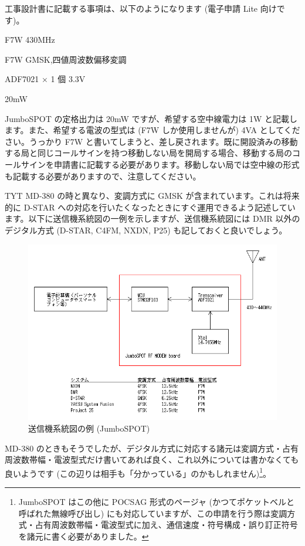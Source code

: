 \documentclass[a4j,oneside]{ujbook}
\begin{document}
工事設計書に記載する事項は、以下のようになります (電子申請 Lite 向けです)。
\begin{description}[style=nextline]
 \item[発射可能な電波の形式及び周波数の範囲] F7W 430MHz 
 \item[変調方式] F7W GMSK,四値周波数偏移変調 
 \item[終段管 (名称×個数・電圧)] ADF7021 × 1 個 3.3V 
 \item[定格出力] 20mW
\end{description}   
JumboSPOT の定格出力は 20mW ですが、希望する空中線電力は 1W と記載します。また、希望する電波の型式は (F7W しか使用しませんが) 4VA としてください。うっかり F7W と書いてしまうと、差し戻されます。既に開設済みの移動する局と同じコールサインを持つ移動しない局を開局する場合、移動する局のコールサインを申請書に記載する必要があります。移動しない局では空中線の形式も記載する必要がありますので、注意してください。

TYT MD-380 の時と異なり、変調方式に GMSK が含まれています。これは将来的に D-STAR への対応を行いたくなったときにすぐ運用できるよう記述しています。以下に送信機系統図の一例を示しますが、送信機系統図には DMR 以外のデジタル方式 (D-STAR, C4FM, NXDN, P25) も記しておくと良いでしょう。

\begin{figure}[H]
 \centering
 \includegraphics[width=15cm]{img/mmdvm-nopocsag.png}
 \caption{送信機系統図の例 (JumboSPOT)}
\end{figure}

MD-380 のときもそうでしたが、デジタル方式に対応する諸元は変調方式・占有周波数帯幅・電波型式だけ書いてあれば良く、これ以外については書かなくても良いようです (この辺りは相手も「分かっている」のかもしれません)\footnote{JumboSPOT はこの他に POCSAG 形式のページャ (かつてポケットベルと呼ばれた無線呼び出し) にも対応していますが、この申請を行う際は変調方式・占有周波数帯幅・電波型式に加え、通信速度・符号構成・誤り訂正符号を諸元に書く必要がありました。}。
\end{document}
